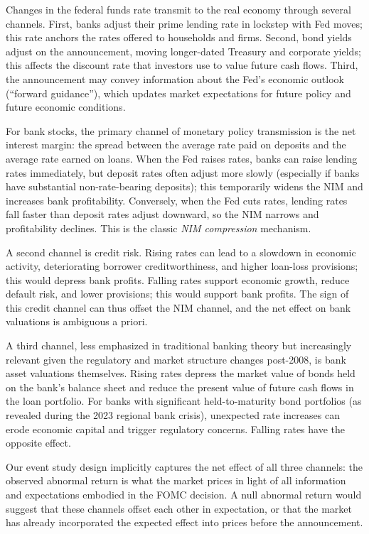 \documentclass[11pt]{article}
\begin{document}
Changes in the federal funds rate transmit to the real economy through several channels. First, banks adjust their prime lending rate in lockstep with Fed moves; this rate anchors the rates offered to households and firms. Second, bond yields adjust on the announcement, moving longer-dated Treasury and corporate yields; this affects the discount rate that investors use to value future cash flows. Third, the announcement may convey information about the Fed's economic outlook (``forward guidance''), which updates market expectations for future policy and future economic conditions.

For bank stocks, the primary channel of monetary policy transmission is the net interest margin: the spread between the average rate paid on deposits and the average rate earned on loans. When the Fed raises rates, banks can raise lending rates immediately, but deposit rates often adjust more slowly (especially if banks have substantial non-rate-bearing deposits); this temporarily widens the NIM and increases bank profitability. Conversely, when the Fed cuts rates, lending rates fall faster than deposit rates adjust downward, so the NIM narrows and profitability declines. This is the classic \textit{NIM compression} mechanism.

A second channel is credit risk. Rising rates can lead to a slowdown in economic activity, deteriorating borrower creditworthiness, and higher loan-loss provisions; this would depress bank profits. Falling rates support economic growth, reduce default risk, and lower provisions; this would support bank profits. The sign of this credit channel can thus offset the NIM channel, and the net effect on bank valuations is ambiguous a priori.

A third channel, less emphasized in traditional banking theory but increasingly relevant given the regulatory and market structure changes post-2008, is bank asset valuations themselves. Rising rates depress the market value of bonds held on the bank's balance sheet and reduce the present value of future cash flows in the loan portfolio. For banks with significant held-to-maturity bond portfolios (as revealed during the 2023 regional bank crisis), unexpected rate increases can erode economic capital and trigger regulatory concerns. Falling rates have the opposite effect.

Our event study design implicitly captures the net effect of all three channels: the observed abnormal return is what the market prices in light of all information and expectations embodied in the FOMC decision. A null abnormal return would suggest that these channels offset each other in expectation, or that the market has already incorporated the expected effect into prices before the announcement.
\end{document}
